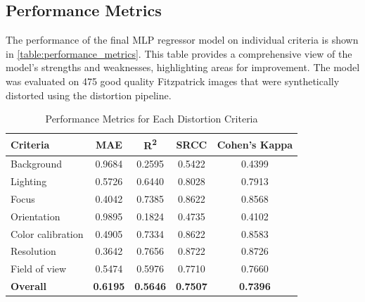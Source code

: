 \subsection{Performance Metrics}
\label{subsec:PerformanceMetrics}
The performance of the final MLP regressor model on individual criteria is shown in \autoref{table:performance_metrics}. This table provides a comprehensive view of the model’s strengths and weaknesses, highlighting areas for improvement. The model was evaluated on 475 good quality Fitzpatrick images that were synthetically distorted using the distortion pipeline. \par
\begin{table}[h]
    \centering
    \begin{tabular}{|l|c|c|c|c|}
        \hline
        \textbf{Criteria} & \textbf{MAE} & \textbf{R\textsuperscript{2}} & \textbf{SRCC} & \textbf{Cohen's Kappa} \\
        \hline
        Background & 0.9684 & 0.2595 & 0.5422 & 0.4399 \\
        Lighting & 0.5726 & 0.6440 & 0.8028 & 0.7913 \\
        Focus & 0.4042 & 0.7385 & 0.8622 & 0.8568 \\
        Orientation & 0.9895 & 0.1824 & 0.4735 & 0.4102 \\
        Color calibration & 0.4905 & 0.7334 & 0.8622 & 0.8583 \\
        Resolution & 0.3642 & 0.7656 & 0.8722 & 0.8726 \\
        Field of view & 0.5474 & 0.5976 & 0.7710 & 0.7660 \\
        \hline
        \textbf{Overall} & \textbf{0.6195} & \textbf{0.5646} & \textbf{0.7507} & \textbf{0.7396} \\
        \hline
    \end{tabular}
    \caption{Performance Metrics for Each Distortion Criteria}
    \label{table:performance_metrics}
\end{table}

\clearpage
